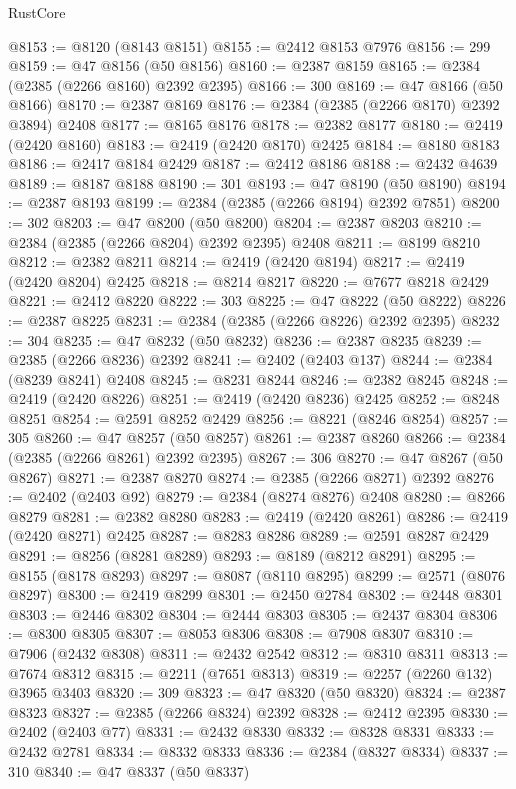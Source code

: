 \begin{lexlean}{RustCore}
\begin{coremodule}
@8153 := @8120 (@8143 @8151)
@8155 := @2412 @8153 @7976
@8156 := 299
@8159 := @47 @8156 (@50 @8156)
@8160 := @2387 @8159
@8165 := @2384 (@2385 (@2266 @8160) @2392 @2395)
@8166 := 300
@8169 := @47 @8166 (@50 @8166)
@8170 := @2387 @8169
@8176 := @2384 (@2385 (@2266 @8170) @2392 @3894) @2408
@8177 := @8165 @8176
@8178 := @2382 @8177
@8180 := @2419 (@2420 @8160)
@8183 := @2419 (@2420 @8170) @2425
@8184 := @8180 @8183
@8186 := @2417 @8184 @2429
@8187 := @2412 @8186
@8188 := @2432 @4639
@8189 := @8187 @8188
@8190 := 301
@8193 := @47 @8190 (@50 @8190)
@8194 := @2387 @8193
@8199 := @2384 (@2385 (@2266 @8194) @2392 @7851)
@8200 := 302
@8203 := @47 @8200 (@50 @8200)
@8204 := @2387 @8203
@8210 := @2384 (@2385 (@2266 @8204) @2392 @2395) @2408
@8211 := @8199 @8210
@8212 := @2382 @8211
@8214 := @2419 (@2420 @8194)
@8217 := @2419 (@2420 @8204) @2425
@8218 := @8214 @8217
@8220 := @7677 @8218 @2429
@8221 := @2412 @8220
@8222 := 303
@8225 := @47 @8222 (@50 @8222)
@8226 := @2387 @8225
@8231 := @2384 (@2385 (@2266 @8226) @2392 @2395)
@8232 := 304
@8235 := @47 @8232 (@50 @8232)
@8236 := @2387 @8235
@8239 := @2385 (@2266 @8236) @2392
@8241 := @2402 (@2403 @137)
@8244 := @2384 (@8239 @8241) @2408
@8245 := @8231 @8244
@8246 := @2382 @8245
@8248 := @2419 (@2420 @8226)
@8251 := @2419 (@2420 @8236) @2425
@8252 := @8248 @8251
@8254 := @2591 @8252 @2429
@8256 := @8221 (@8246 @8254)
@8257 := 305
@8260 := @47 @8257 (@50 @8257)
@8261 := @2387 @8260
@8266 := @2384 (@2385 (@2266 @8261) @2392 @2395)
@8267 := 306
@8270 := @47 @8267 (@50 @8267)
@8271 := @2387 @8270
@8274 := @2385 (@2266 @8271) @2392
@8276 := @2402 (@2403 @92)
@8279 := @2384 (@8274 @8276) @2408
@8280 := @8266 @8279
@8281 := @2382 @8280
@8283 := @2419 (@2420 @8261)
@8286 := @2419 (@2420 @8271) @2425
@8287 := @8283 @8286
@8289 := @2591 @8287 @2429
@8291 := @8256 (@8281 @8289)
@8293 := @8189 (@8212 @8291)
@8295 := @8155 (@8178 @8293)
@8297 := @8087 (@8110 @8295)
@8299 := @2571 (@8076 @8297)
@8300 := @2419 @8299
@8301 := @2450 @2784
@8302 := @2448 @8301
@8303 := @2446 @8302
@8304 := @2444 @8303
@8305 := @2437 @8304
@8306 := @8300 @8305
@8307 := @8053 @8306
@8308 := @7908 @8307
@8310 := @7906 (@2432 @8308)
@8311 := @2432 @2542
@8312 := @8310 @8311
@8313 := @7674 @8312
@8315 := @2211 (@7651 @8313)
@8319 := @2257 (@2260 @132) @3965 @3403
@8320 := 309
@8323 := @47 @8320 (@50 @8320)
@8324 := @2387 @8323
@8327 := @2385 (@2266 @8324) @2392
@8328 := @2412 @2395
@8330 := @2402 (@2403 @77)
@8331 := @2432 @8330
@8332 := @8328 @8331
@8333 := @2432 @2781
@8334 := @8332 @8333
@8336 := @2384 (@8327 @8334)
@8337 := 310
@8340 := @47 @8337 (@50 @8337)

\end{coremodule}
\end{lexlean}
